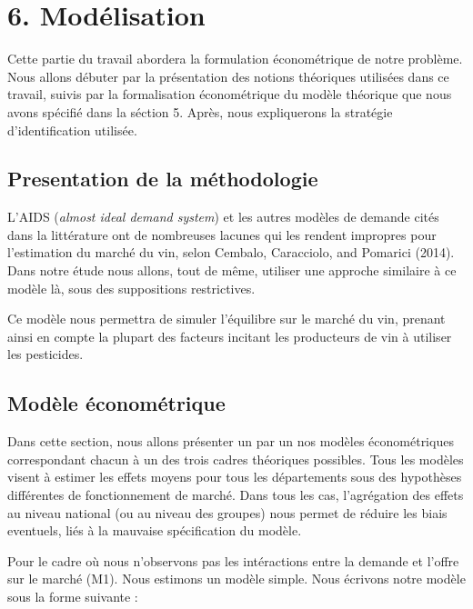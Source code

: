 \documentclass[11pt,]{article}
\begin{document}
\hypertarget{modelisation}{%
\section{6. Modélisation}\label{modelisation}}

Cette partie du travail abordera la formulation économétrique de notre
problème. Nous allons débuter par la présentation des notions théoriques
utilisées dans ce travail, suivis par la formalisation économétrique du
modèle théorique que nous avons spécifié dans la séction 5. Après, nous
expliquerons la stratégie d'identification utilisée.

\hypertarget{presentation-de-la-methodologie}{%
\subsection{Presentation de la
méthodologie}\label{presentation-de-la-methodologie}}

L'AIDS (\emph{almost ideal demand system}) et les autres modèles de
demande cités dans la littérature ont de nombreuses lacunes qui les
rendent impropres pour l'estimation du marché du vin, selon Cembalo,
Caracciolo, and Pomarici (2014). Dans notre étude nous allons, tout de
même, utiliser une approche similaire à ce modèle là, sous des
suppositions restrictives.

Ce modèle nous permettra de simuler l'équilibre sur le marché du vin,
prenant ainsi en compte la plupart des facteurs incitant les producteurs
de vin à utiliser les pesticides.

\hypertarget{modele-econometrique}{%
\subsection{Modèle économétrique}\label{modele-econometrique}}

Dans cette section, nous allons présenter un par un nos modèles
économétriques correspondant chacun à un des trois cadres théoriques
possibles. Tous les modèles visent à estimer les effets moyens pour tous
les départements sous des hypothèses différentes de fonctionnement de
marché. Dans tous les cas, l'agrégation des effets au niveau national
(ou au niveau des groupes) nous permet de réduire les biais eventuels,
liés à la mauvaise spécification du modèle.

Pour le cadre où nous n'observons pas les intéractions entre la demande
et l'offre sur le marché (M1). Nous estimons un modèle simple. Nous
écrivons notre modèle sous la forme suivante :
\end{document}
